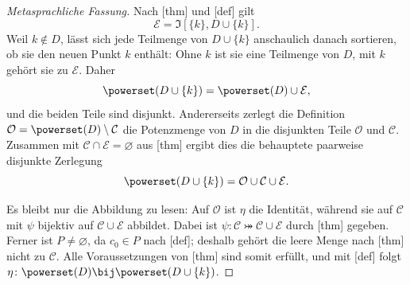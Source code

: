 \documentclass[main.tex]{subfiles}
\begin{document}
\begin{proof}[Metasprachliche Fassung]
Nach [thm] und
[def] gilt
\[
  \mathcal E=\mathfrak I[\{k\},D\cup\{k\}].
\]
Weil \(k\notin D\),
lässt sich jede Teilmenge von \(D\cup\{k\}\) anschaulich danach
sortieren, ob sie den neuen Punkt \(k\) enthält: Ohne \(k\) ist sie eine
Teilmenge von \(D\), mit \(k\) gehört sie zu \(\mathcal E\). Daher
\[
  \powerset(D\cup\{k\})=\powerset(D)\cup\mathcal E,
\]
und die beiden Teile sind disjunkt. Andererseits zerlegt die Definition
\(\mathcal O=\powerset(D)\setminus\mathcal C\) die Potenzmenge von \(D\)
in die disjunkten Teile \(\mathcal O\) und \(\mathcal C\). Zusammen mit
\(\mathcal C\cap\mathcal E=\varnothing\) aus
[thm] ergibt dies die
behauptete paarweise disjunkte Zerlegung
\[
  \powerset(D\cup\{k\})=\mathcal O\cup\mathcal C\cup\mathcal E.
\]

Es bleibt nur die Abbildung zu lesen: Auf \(\mathcal O\) ist \(\eta\)
die Identität, während sie auf \(\mathcal C\) mit \(\psi\) bijektiv auf
\(\mathcal C\cup\mathcal E\) abbildet. Dabei ist
\(\psi\colon\mathcal C\bij\mathcal C\cup\mathcal E\) durch
[thm] gegeben. Ferner
ist \(P\neq\varnothing\), da \(c_0\in P\) nach
[def]; deshalb gehört die leere
Menge nach [thm] nicht zu
\(\mathcal C\). Alle Voraussetzungen von
[thm] sind somit erfüllt, und
mit [def] folgt
\(\eta\colon\powerset(D)\bij\powerset(D\cup\{k\})\).
\end{proof}
\end{document}
